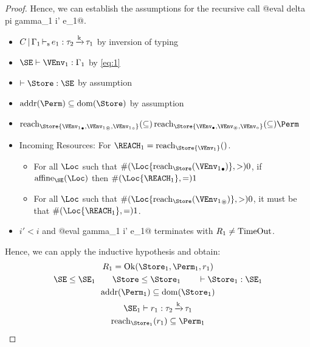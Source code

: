 \begin{proof}
  Hence, we can establish the assumptions for the recursive call
  @eval delta pi gamma_1 i' e_1@.
  \begin{itemize}
  \item  $C \operatorname{|} \Gamma_1 \operatorname{\vdash_s} e_1 : \tau_2\operatorname{\xrightarrow{k}}\tau_1$ by inversion of typing
  \item $\SE \vdash \VEnv_1 : \E_1$ by \eqref{eq:1}
  \item $\vdash \Store : \SE$ by assumption
  \item $\Addresses\Perm \subseteq \Dom\Store$ by assumption
  \item $
    \Reach\Store{\Active{\VEnv_1}, \MutableBorrows{\VEnv_1},
      \ImmutableBorrows{\VEnv_1}}
    \subseteq
    \Reach\Store{\Active\VEnv, \MutableBorrows\VEnv, \ImmutableBorrows\VEnv}
    \subseteq \Perm$
  \item Incoming Resources: For $\REACH_1 = \Reach\Store{\VEnv_1}$.
    \begin{itemize}
    \item
      For all $\Loc$ such that $\MultiNumber\Loc{\Reach{\Store}{\Active{\VEnv_1}}} >0$,
      if $\Affine{\SE}\Loc$ then $\MultiNumber\Loc{\REACH_1}= 1$
    \item For all $\Loc$ such that $
      \MultiNumber\Loc{\Reach{\Store}{\MutableBorrows{\VEnv_1}}} >0$, it
      must be that $\MultiNumber\Loc{\REACH_1}=1$.
    \end{itemize}
  \item $i'<i$ and   @eval \Store \Perm gamma_1 i' e_1@ terminates
    with $R_1 \ne \operatorname{TimeOut}$.
  \end{itemize}
  Hence, we can apply the inductive hypothesis and obtain:
  \begin{gather}
    \label{eq:2}
    R_1 = \Ok{\Store_1, \Perm_1, r_1}
    \\
    \SE \le \SE_1 \qquad
    \Store \le \Store_1 \qquad
    \vdash \Store_1 :    \SE_1
    \\
    \Addresses{\Perm_1} \subseteq \Dom{\Store_1}
    \\\label{eq:3}
    \SE_1 \vdash r_1 : \tau_2\tarr{k}\tau_1
    \\\label{eq:10}
    \Reach{\Store_1}{r_1} \subseteq \Perm_1
  \end{gather}
\end{proof}
